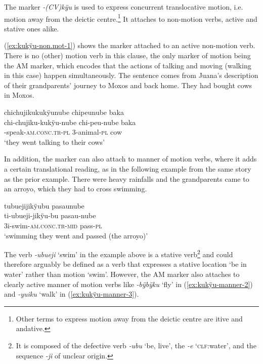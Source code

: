 The marker \textit{-(CV)kÿu} is used to express concurrent translocative motion, i.e. motion away from the deictic centre.\footnote{Other terms to express motion away from the deictic centre are itive and andative.} It attaches to non-motion verbs, active and stative ones alike. 

(\ref{ex:kukÿu-non.mot-1}) shows the marker attached to an active non-motion verb. There is no (other) motion verb in this clause, the only marker of motion being the AM marker, which encodes that the actions of talking and moving (walking in this case) happen simultaneously. The sentence comes from Juana’s description of their grandparents’ journey to Moxos and back home. They had bought cows in Moxos.

\ea\label{ex:kukÿu-non.mot-1}
\begingl 
\glpreamble chichujikukukÿunube chipeunube baka\\
\gla chi-chujiku-kukÿu-nube chi-peu-nube baka\\ 
-speak-\textsc{am.conc.tr}-\textsc{pl} 3-animal-\textsc{pl} cow\\ 
\glft ‘they went talking to their cows’\\ 
\endgl
\trailingcitation{[jxx-p151016l-2]}
\xe


In addition, the marker can also attach to  manner of motion verbs, where it adds a certain translational reading, as in the following example from the same story as the prior example. There were heavy rainfalls and the grandparents came to an arroyo, which they had to cross swimming.

\ea\label{ex:kukÿu-manner-1}
\begingl 
\glpreamble tubuejijikÿubu pasaunube\\
\gla ti-ubueji-jikÿu-bu pasau-nube\\ 
\glb 3i-swim-\textsc{am.conc.tr}-\textsc{mid} pass-\textsc{pl}\\ 
\glft ‘swimming they went and passed (the arroyo)’\\ 
\endgl
\trailingcitation{[jxx-p151016l-2]}
\xe

The verb \textit{-ubueji} ‘swim’ in the example above is a stative verb\footnote{It is composed of the defective verb \textit{-ubu} ‘be, live’, the  \textit{-e} ‘\textsc{clf}:water’, and the sequence \textit{-ji} of unclear origin.} and could therefore arguably be defined as a verb that expresses a stative location ‘be in water’ rather than motion ‘swim’. However, the AM marker also attaches to clearly active  manner of motion verbs like \textit{-bÿbÿku} ‘fly’ in (\ref{ex:kukÿu-manner-2}) and \textit{-yuiku} ‘walk’ in (\ref{ex:kukÿu-manner-3}).

